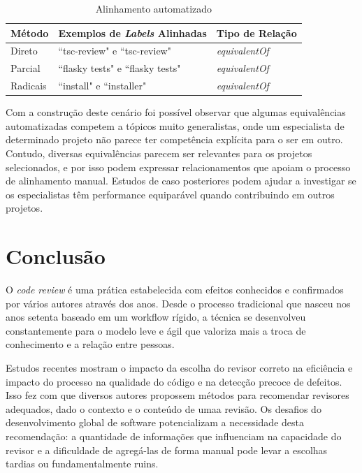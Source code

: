 \documentclass[peerreview]{acmart}
\begin{document}
\begin{table}[!h]
  \centering
\begin{tabular}{@{}|l|l|l|@{}}
\hline
Método       & Exemplos de \textit{Labels} Alinhadas           & Tipo de Relação                 \\ \hline
Direto       & ``tsc-review" e ``tsc-review"        & \textit{equivalentOf}           \\
Parcial      & ``flasky tests" e ``flasky tests"     & \textit{equivalentOf}           \\
Radicais     & ``install" e ``installer"     & \textit{equivalentOf}           \\ \hline
\end{tabular}
\caption{Alinhamento automatizado}\label{tab:matching}
\end{table}

Com a construção deste cenário foi possível observar que algumas equivalências automatizadas competem a tópicos muito generalistas, onde um especialista de determinado projeto não parece ter competência explícita para o ser em outro. Contudo, diversas equivalências parecem ser relevantes para os projetos selecionados, e por isso podem expressar relacionamentos que apoiam o processo de alinhamento manual. Estudos de caso posteriores podem ajudar a investigar se os especialistas têm performance equiparável quando contribuindo em outros projetos.

\section{Conclusão}\label{cha:conclusao}

O \textit{code review} é uma prática estabelecida com efeitos conhecidos e confirmados por vários autores através dos anos. Desde o processo tradicional que nasceu nos anos setenta baseado em um workflow rígido, a técnica se desenvolveu constantemente para o modelo leve e ágil que valoriza mais a troca de conhecimento e a relação entre pessoas.

Estudos recentes mostram o impacto da escolha do revisor correto na eficiência e impacto do processo na qualidade do código e na detecção precoce de defeitos. Isso fez com que diversos autores propossem métodos para recomendar revisores adequados, dado o contexto e o conteúdo de umaa revisão. Os desafios do desenvolvimento global de software potencializam a necessidade desta recomendação: a quantidade de informações que influenciam na capacidade do revisor e a dificuldade de agregá-las de forma manual pode levar a escolhas tardias ou fundamentalmente ruins.
\end{document}
